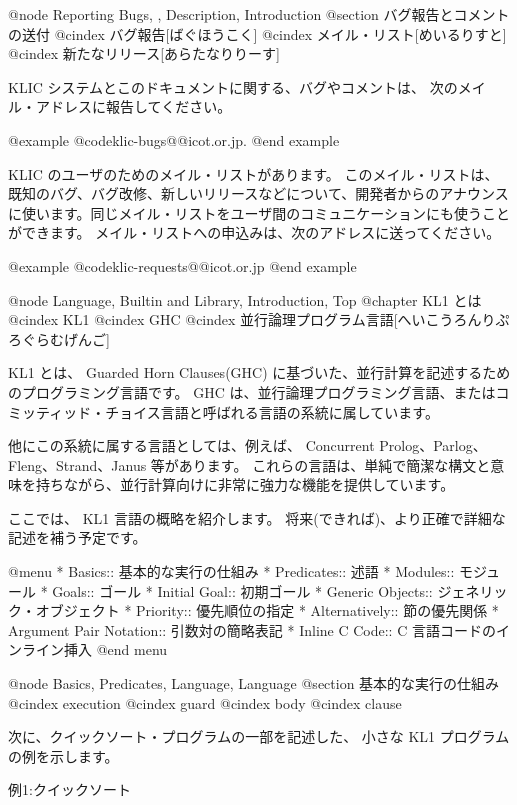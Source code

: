 @node Reporting Bugs,  , Description, Introduction
@section バグ報告とコメントの送付
@cindex バグ報告[ばぐほうこく]
@cindex メイル・リスト[めいるりすと]
@cindex 新たなリリース[あらたなりりーす]

KLIC システムとこのドキュメントに関する、バグやコメントは、
次のメイル・アドレスに報告してください。

@example
@code{klic-bugs@@icot.or.jp}.
@end example

KLIC のユーザのためのメイル・リストがあります。
このメイル・リストは、既知のバグ、バグ改修、新しいリリースなどについて、開発者からのアナウンスに使います。同じメイル・リストをユーザ間のコミュニケーションにも使うことができます。
メイル・リストへの申込みは、次のアドレスに送ってください。

@example
@code{klic-requests@@icot.or.jp}
@end example


@node Language, Builtin and Library, Introduction, Top
@chapter  KL1 とは
@cindex KL1
@cindex GHC
@cindex 並行論理プログラム言語[へいこうろんりぷろぐらむげんご]

KL1 とは、 Guarded Horn Clauses(GHC) に基づいた、並行計算を記述するためのプログラミング言語です。
GHC は、並行論理プログラミング言語、またはコミッティッド・チョイス言語と呼ばれる言語の系統に属しています。

他にこの系統に属する言語としては、例えば、 Concurrent Prolog、Parlog、
Fleng、Strand、Janus 等があります。
これらの言語は、単純で簡潔な構文と意味を持ちながら、並行計算向けに非常に強力な機能を提供しています。

ここでは、 KL1 言語の概略を紹介します。
将来(できれば)、より正確で詳細な記述を補う予定です。

@menu
* Basics::                      基本的な実行の仕組み
* Predicates::                  述語
* Modules::                     モジュール
* Goals::                       ゴール
* Initial Goal::                初期ゴール
* Generic Objects::             ジェネリック・オブジェクト
* Priority::                    優先順位の指定
* Alternatively::               節の優先関係
* Argument Pair Notation::      引数対の簡略表記
* Inline C Code::               C 言語コードのインライン挿入
@end menu

@node Basics, Predicates, Language, Language
@section 基本的な実行の仕組み
@cindex execution
@cindex guard
@cindex body
@cindex clause


次に、クイックソート・プログラムの一部を記述した、
小さな KL1 プログラムの例を示します。

例1:クイックソート

